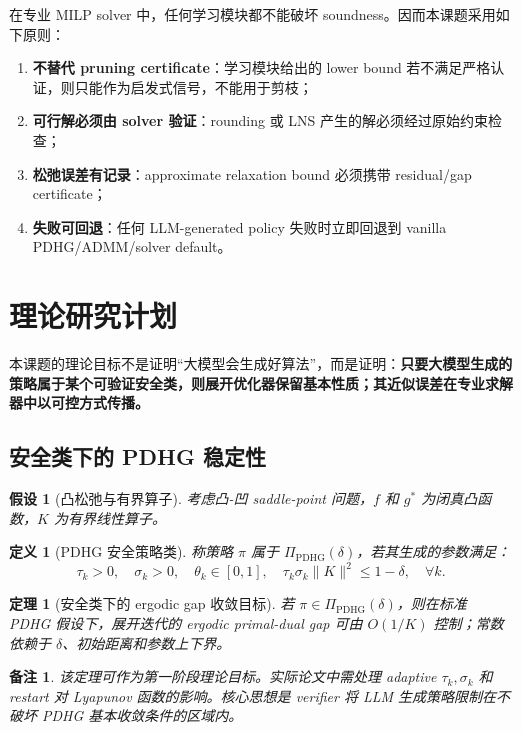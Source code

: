 \documentclass[UTF8,a4paper,12pt,fontset=fandol]{ctexart}
\newtheorem{definition}{定义}
\newtheorem{assumption}{假设}
\newtheorem{theorem}{定理}
\newtheorem{remark}{备注}
\begin{document}
在专业 MILP solver 中，任何学习模块都不能破坏 soundness。因而本课题采用如下原则：
\begin{enumerate}[leftmargin=2em]
    \item \textbf{不替代 pruning certificate}：学习模块给出的 lower bound 若不满足严格认证，则只能作为启发式信号，不能用于剪枝；
    \item \textbf{可行解必须由 solver 验证}：rounding 或 LNS 产生的解必须经过原始约束检查；
    \item \textbf{松弛误差有记录}：approximate relaxation bound 必须携带 residual/gap certificate；
    \item \textbf{失败可回退}：任何 LLM-generated policy 失败时立即回退到 vanilla PDHG/ADMM/solver default。
\end{enumerate}

\section{理论研究计划}

本课题的理论目标不是证明“大模型会生成好算法”，而是证明：\textbf{只要大模型生成的策略属于某个可验证安全类，则展开优化器保留基本性质；其近似误差在专业求解器中以可控方式传播。}

\subsection{安全类下的 PDHG 稳定性}

\begin{assumption}[凸松弛与有界算子]
考虑凸-凹 saddle-point 问题，$f$ 和 $g^\ast$ 为闭真凸函数，$K$ 为有界线性算子。
\end{assumption}

\begin{definition}[PDHG 安全策略类]
称策略 $\pi$ 属于 $\Pi_{\mathrm{PDHG}}(\delta)$，若其生成的参数满足：
\begin{equation}
\tau_k>0,\quad \sigma_k>0,\quad \theta_k\in[0,1],
\quad
\tau_k\sigma_k\|K\|^2 \le 1-\delta,
\quad \forall k.
\end{equation}
\end{definition}

\begin{theorem}[安全类下的 ergodic gap 收敛目标]
若 $\pi\in\Pi_{\mathrm{PDHG}}(\delta)$，则在标准 PDHG 假设下，展开迭代的 ergodic primal-dual gap 可由 $O(1/K)$ 控制；常数依赖于 $\delta$、初始距离和参数上下界。
\end{theorem}

\begin{remark}
该定理可作为第一阶段理论目标。实际论文中需处理 adaptive $\tau_k,\sigma_k$ 和 restart 对 Lyapunov 函数的影响。核心思想是 verifier 将 LLM 生成策略限制在不破坏 PDHG 基本收敛条件的区域内。
\end{remark}
\end{document}

